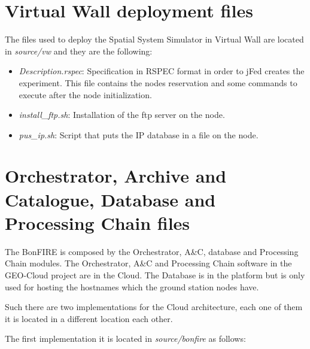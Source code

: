 \section{Virtual Wall deployment files}

The files used to deploy the Spatial System Simulator in Virtual Wall are
located in \emph{source/vw} and they are the following:
\begin{itemize}
\item \emph{Description.rspec}: Specification in RSPEC format in order to jFed creates the experiment.  This file contains the nodes reservation and some commands to execute after the node initialization.
\item \emph{install\_ftp.sh}: Installation of the ftp server on the node.
\item \emph{pus\_ip.sh}: Script that puts the IP database in a file on the node.
\end{itemize}

\section{Orchestrator, Archive and Catalogue, Database and Processing Chain
  files}

The BonFIRE is composed by the Orchestrator, A\&C, database and Processing Chain
modules. The Orchestrator, A\&C and Processing Chain software in the GEO-Cloud
project are in the Cloud. The Database is in the \bonfire platform but is only
used for hosting the hostnames which the ground station nodes have.

Such there are two implementations for the Cloud architecture, each one of them
it is located in a different location each other.

The first implementation it is located in \emph{source/bonfire} as follows:

